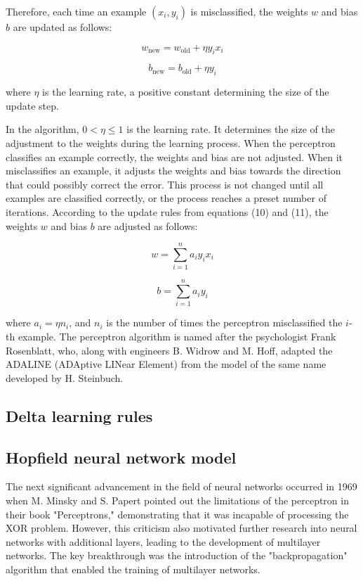 \documentclass[paper=a4, fontsize=11pt]{scrartcl} %
\numberwithin{equation}{section} %
\numberwithin{figure}{section} %
\numberwithin{table}{section} %
\begin{document}
Therefore, each time an example \( (x_i, y_i) \) is misclassified, the weights \( w \) and bias \( b \) are updated as follows:

\begin{equation}
w_{\text{new}} = w_{\text{old}} + \eta y_i x_i
\end{equation}

\begin{equation}
b_{\text{new}} = b_{\text{old}} + \eta y_i
\end{equation}

where \( \eta \) is the learning rate, a positive constant determining the size of the update step.


In the algorithm, \( 0 < \eta \leq 1 \) is the learning rate. It determines the size of the adjustment to the weights during the learning process. When the perceptron classifies an example correctly, the weights and bias are not adjusted. When it misclassifies an example, it adjusts the weights and bias towards the direction that could possibly correct the error. This process is not changed until all examples are classified correctly, or the process reaches a preset number of iterations. According to the update rules from equations (10) and (11), the weights \( w \) and bias \( b \) are adjusted as follows:

\begin{equation}
w = \sum_{i=1}^{n} a_i y_i x_i
\end{equation}

\begin{equation}
b = \sum_{i=1}^{n} a_i y_i
\end{equation}

where \( a_i = \eta n_i \), and \( n_i \) is the number of times the perceptron misclassified the \( i \)-th example. The perceptron algorithm is named after the psychologist Frank Rosenblatt, who, along with engineers B. Widrow and M. Hoff, adapted the ADALINE (ADAptive LINear Element) from the model of the same name developed by H. Steinbuch.

\subsection{Delta learning rules}

\subsection{Hopfield neural network model}
The next significant advancement in the field of neural networks occurred in 1969 when M. Minsky and S. Papert pointed out the limitations of the perceptron in their book "Perceptrons," demonstrating that it was incapable of processing the XOR problem. However, this criticism also motivated further research into neural networks with additional layers, leading to the development of multilayer networks. The key breakthrough was the introduction of the "backpropagation" algorithm that enabled the training of multilayer networks.
\end{document}
